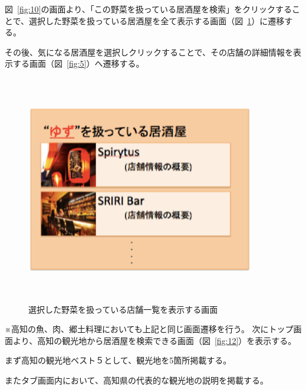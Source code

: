 図~\ref{fig:10}の画面より、「この野菜を扱っている居酒屋を検索」をクリックすることで、選択した野菜を扱っている居酒屋を全て表示する画面（図~\ref{fig:11}）に遷移する。



その後、気になる居酒屋を選択しクリックすることで、その店舗の詳細情報を表示する画面（図~\ref{fig:5}）へ遷移する。
\clearpage
\begin {figure}[!htbp]
    \begin{center}
    \includegraphics [height=10cm, width=10cm]{11.eps}
    \caption {選択した野菜を扱っている店舗一覧を表示する画面}
    \label {fig:11}
    \end{center}
\end {figure}

※高知の魚、肉、郷土料理においても上記と同じ画面遷移を行う。
次にトップ画面より、高知の観光地から居酒屋を検索できる画面（図~\ref{fig:12}）を表示する。



まず高知の観光地ベスト５として、観光地を5箇所掲載する。



またタブ画面内において、高知県の代表的な観光地の説明を掲載する。



